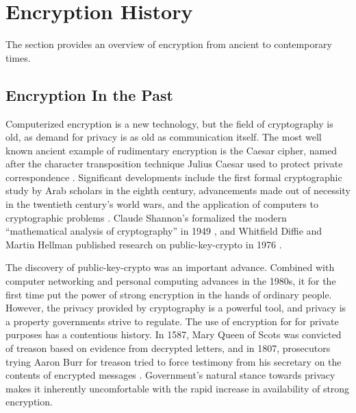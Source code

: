
\section{Encryption History}
\label{sec-crypto-history}

The section provides an overview of encryption from ancient to contemporary times.

\subsection{Encryption In the Past}
\label{sec-history-old}

Computerized encryption is a new technology, but the field of cryptography is old, as demand for privacy is as old as
communication itself. The most well known ancient example of rudimentary encryption is the Caesar cipher, named after
the character transposition technique Julius Caesar used to protect private correspondence
\cite{luciano_cryptology_1987}. Significant developments include the first formal cryptographic study by Arab scholars
in the eighth century, advancements made out of necessity in the twentieth century's world wars, and the application of
computers to cryptographic problems \cite{kahn_codebreakers_1996}. Claude Shannon's formalized the modern ``mathematical
analysis of cryptography'' in 1949 \cite{shannon_communication_1949}, and Whitfield Diffie and Martin Hellman published
research on \ac{public-key-crypto} in 1976 \cite{diffie_new_1976}.

The discovery of \ac{public-key-crypto} was an important advance. Combined with computer networking and personal
computing advances in the 1980s, it for the first time put the power of strong encryption in the hands of ordinary
people. However, the privacy provided by cryptography is a powerful tool, and privacy is a property governments strive
to regulate. The use of encryption for for private purposes has a contentious history. In 1587, Mary Queen of Scots was
convicted of treason based on evidence from decrypted letters, and in 1807, prosecutors trying Aaron Burr for treason
tried to force testimony from his secretary on the contents of encrypted messages \cite{kerr_encryption_2017}.
Government's natural stance towards privacy makes it inherently uncomfortable with the rapid increase in availability of
strong encryption.


